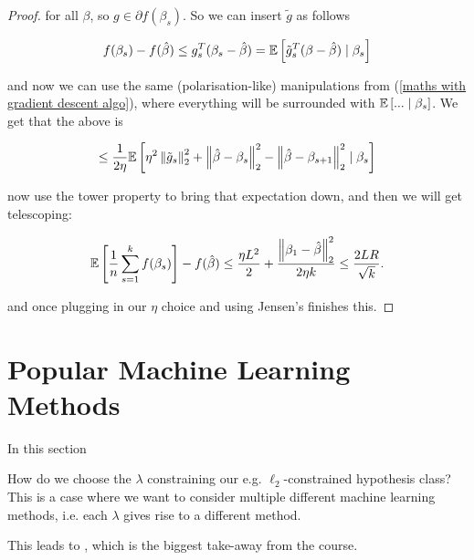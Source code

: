 \documentclass[11pt]{scrartcl}
\begin{document}
\begin{theorem}
\begin{proof}
for all $\beta$, so $g \in \partial f(\beta_s)$. So we can insert $\tilde{g}$ as follows

\begin{equation}
    f(\beta_s) - f(\hat{\beta}) \le g_s^T (\beta_s - \hat{\beta}) = \mathbb{E} \left[ \tilde{g}_s^T (\beta - \hat{\beta}) \mid \beta_s \right]
\end{equation}

and now we can use the same (polarisation-like) manipulations from (\ref{maths with gradient descent algo}), where everything will be surrounded with $\mathbb{E} \left[ ... \mid \beta_s \right]$. We get that the above is

\begin{align}
    \le \frac{1}{2\eta} \mathbb{E} \left[  \eta^2 \left\lVert\tilde{g}_s\right\rVert_2^2 + \left\lVert\hat{\beta} - \beta_s\right\rVert_2^2 - \left\lVert\hat{\beta} - \beta_{s+1}\right\rVert_2^2 \mid \beta_s \right]
\end{align}

now use the tower property to bring that expectation down, and then we will get telescoping:

\begin{equation}
    \mathbb{E} \left[ \frac1n \sum_{s=1}^k f(\beta_s) \right] - f(\hat{\beta}) \le \frac{\eta L^2}{2} + \frac{\left\lVert\beta_1 - \hat{\beta}\right\rVert_2^2}{2 \eta k} \le \frac{2LR}{\sqrt{k}}.
\end{equation}

and once plugging in our $\eta$ choice and using Jensen's finishes this.


\end{proof}
\end{theorem}

\section{Popular Machine Learning Methods}

In this section

How do we choose the $\lambda$ constraining our e.g. $\ell_2$-constrained hypothesis class? This is a case where we want to consider multiple different machine learning methods, i.e. each $\lambda$ gives rise to a different method.

This leads to , which is the biggest take-away from the course.
\end{document}
